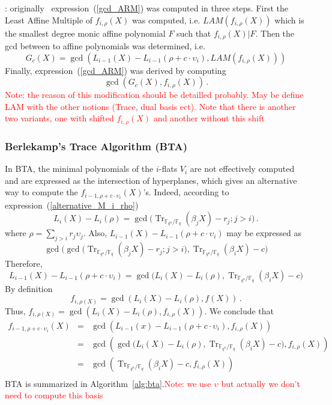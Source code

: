 \documentclass{article}
\newcommand{\ff}[1]{\mathbb{F}_{#1}}
\newcommand{\qq}{q}
\newcommand{\nn}{n}
\newcommand{\qn}{{\qq^\nn}}
\newcommand{\basef}{\ff{\qq}}
\newcommand{\extf}{\ff{\qn}}
\DeclareMathOperator{\Tr}{Tr}
\newcommand{\Notes}[1]{\textcolor{red}{Note: #1}}
\begin{document}
: originally~\cite{van1989geometric} expression~(\ref{gcd_ARM}) was computed in three steps. First the Least Affine Multiple of 
$f_{i,\rho}(X)$ was computed, i.e. $LAM(f_{i,\rho}(X))$ which is  the smallest degree monic affine polynomial $F$ such that $f_{i,\rho}(X)|F$. Then the gcd between to affine polynomials was determined, i.e. 
$$G_c(X)=\gcd(L_{i-1}(X)-L_{i-1}(\rho+c \cdot \upsilon_i),LAM(f_{i,\rho}(X)) ) $$
Finally, expression~(\ref{gcd_ARM}) was derived by computing
$$\gcd(G_c(X), f_{i,\rho}(X))\,.$$
\Notes{the reason of this modification should be detailled probably. May be define LAM with the other notions (Trace, dual basis ect). Note that there is 
another two variants, one with shifted $f_{i,\rho}(X)$ and another without this shift}




\subsubsection{Berlekamp's Trace Algorithm (BTA)}
\label{sec:BTA}
In BTA, the minimal polynomials of the $i$-flats $V_{i}$ are not effectively computed and are expressed as the intersection of hyperplanes, which gives an alternative way to compute the $f_{i-1,\rho+c \cdot \upsilon_i}(X)$'s. Indeed, according to expression~(\ref{alternative_M_i_rho})
$$L_i(X)-L_i(\rho)=\gcd\bigl(\Tr_{\extf/\basef}(\beta_j X) -r_j ;j>i\bigr)\,.$$
where $\rho=\sum_{j>i}r_j\upsilon_j$. Also, $L_{i-1}(X)-L_{i-1}(\rho +c \cdot \upsilon_i)$ may be expressed as
$$
\gcd\bigl(\gcd\bigl(\Tr_{\extf/\basef}(\beta_j X) -r_j ;j>i\bigr), \Tr_{\extf/\basef}(\beta_i X) -c  \bigr)
$$
Therefore, 
\begin{equation}
\label{alt_formula}
L_{i-1}(X)-L_{i-1}(\rho +c \cdot \upsilon_i)=
\gcd\bigl(L_i(X)-L_i(\rho), \Tr_{\extf/\basef}(\beta_i X) -c  \bigr)
\end{equation}
By definition 
$$f_{i,\rho(X)}=\gcd(L_i(X)-L_i(\rho),f(X))\,.$$ 
Thus, $f_{i,\rho(X)}=\gcd(L_i(X)-L_i(\rho),f_{i,\rho}(X))$.
We conclude that 
$$
\begin{array}{lll}
f_{i-1,\rho+c \cdot \upsilon_i}(X)&=&\gcd(L_{i-1}(x)-L_{i-1}(\rho +c \cdot \upsilon_i) ,f_{i,\rho}(X)  ) \\
&=&  \gcd(  \gcd\bigl(L_i(X)-L_i(\rho), \Tr_{\extf/\basef}(\beta_i X) -c  \bigr)     ,  f_{i,\rho}(X) )    \\
&=&  \gcd( \Tr_{\extf/\basef}(\beta_i X) -c ,  f_{i,\rho}(X) )    \\
\end{array}
$$
BTA is summarized in Algorithm~\ref{alg:bta}.\Notes{we use $\upsilon$ but actually we don't need to compute this basis}
\end{document}
